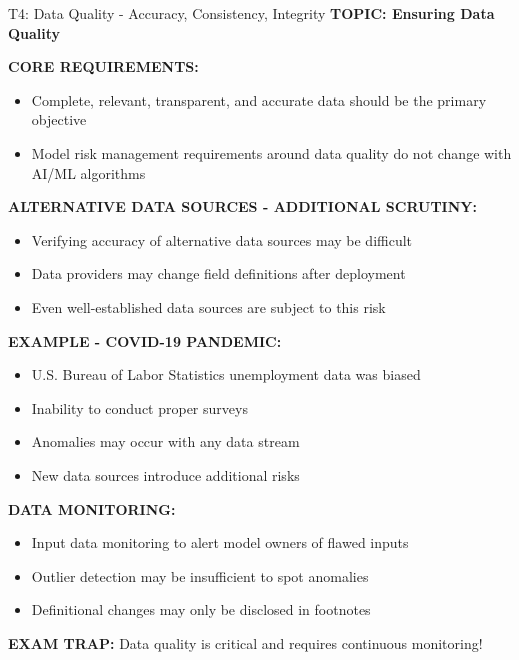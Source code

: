 \documentclass[8pt]{beamer}
\begin{document}
	\begin{frame}{T4: Data Quality - Accuracy, Consistency, Integrity}
		\fontsize{6.5}{7.5}\selectfont
		\textbf{TOPIC: Ensuring Data Quality}
		
		\vspace{0.1cm}
		\textbf{CORE REQUIREMENTS:}
		\begin{itemize}
			\item Complete, relevant, transparent, and accurate data should be the primary objective
			\item Model risk management requirements around data quality do not change with AI/ML algorithms
		\end{itemize}
		
		\vspace{0.1cm}
		\textbf{ALTERNATIVE DATA SOURCES - ADDITIONAL SCRUTINY:}
		\begin{itemize}
			\item Verifying accuracy of alternative data sources may be difficult
			\item Data providers may change field definitions after deployment
			\item Even well-established data sources are subject to this risk
		\end{itemize}
		
		\vspace{0.1cm}
		\textbf{EXAMPLE - COVID-19 PANDEMIC:}
		\begin{itemize}
			\item U.S. Bureau of Labor Statistics unemployment data was biased
			\item Inability to conduct proper surveys
			\item Anomalies may occur with any data stream
			\item New data sources introduce additional risks
		\end{itemize}
		
		\vspace{0.1cm}
		\textbf{DATA MONITORING:}
		\begin{itemize}
			\item Input data monitoring to alert model owners of flawed inputs
			\item Outlier detection may be insufficient to spot anomalies
			\item Definitional changes may only be disclosed in footnotes
		\end{itemize}
		
		\textcolor{myred}{\textbf{EXAM TRAP:}} Data quality is \textcolor{myblue}{critical and requires continuous monitoring}!
	\end{frame}
	
\end{document}
